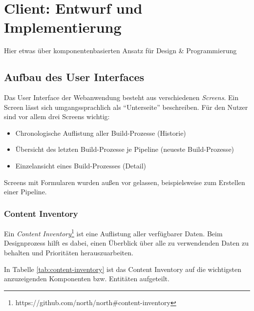 \section{Client: Entwurf und Implementierung}

{\draft Hier etwas über komponentenbasierten Ansatz für Design \& Programmierung}

\subsection{Aufbau des User Interfaces}
\label{subsec:entwurf-user-interface}

Das User Interface der Webanwendung besteht aus verschiedenen \emph{Screens}. Ein Screen lässt sich umgangssprachlich als ``Unterseite'' beschreiben. Für den Nutzer sind vor allem drei Screens wichtig:

\begin{itemize}
  \item Chronologische Auflistung aller Build-Prozesse (Historie)
  \item Übersicht des letzten Build-Prozesse je Pipeline (neueste Build-Prozesse)
  \item Einzelansicht eines Build-Prozesses (Detail)
\end{itemize}

Screens mit Formularen wurden außen vor gelassen, beispielsweise zum Erstellen einer Pipeline.

\subsubsection{Content Inventory}

Ein \emph{Content Inventory}\footnote{https://github.com/north/north\#content-inventory} ist eine Auflistung aller verfügbarer Daten. Beim Designprozess hilft es dabei, einen Überblick über alle zu verwendenden Daten zu behalten und Prioritäten herauszuarbeiten.

In Tabelle \ref{tab:content-inventory} ist das Content Inventory auf die wichtigsten anzuzeigenden Komponenten bzw. Entitäten aufgeteilt.

